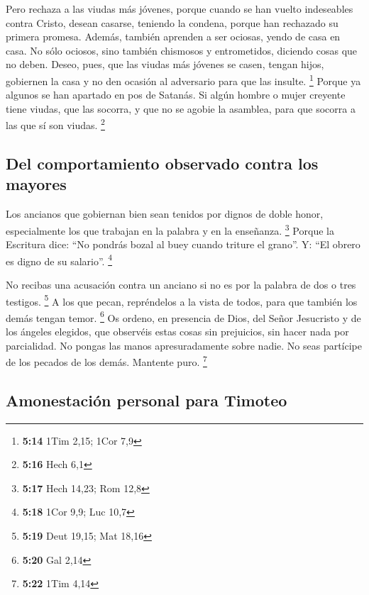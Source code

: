 \begin{paracol}{2}
 Pero rechaza a las viudas más jóvenes, porque cuando se
han vuelto indeseables contra Cristo, desean casarse, 
teniendo la condena, porque han rechazado su primera promesa.
 Además, también aprenden a ser ociosas, yendo de casa en
casa. No sólo ociosos, sino también chismosos y entrometidos, diciendo
cosas que no deben.  Deseo, pues, que las viudas más
jóvenes se casen, tengan hijos, gobiernen la casa y no den ocasión al
adversario para que las insulte. \footnote{\textbf{5:14} 1Tim 2,15; 1Cor
  7,9}  Porque ya algunos se han apartado en pos de
Satanás.  Si algún hombre o mujer creyente tiene viudas,
que las socorra, y que no se agobie la asamblea, para que socorra a las
que sí son viudas. \footnote{\textbf{5:16} Hech 6,1}

\hypertarget{del-comportamiento-observado-contra-los-mayores}{%
\subsection{Del comportamiento observado contra los
mayores}\label{del-comportamiento-observado-contra-los-mayores}}

 Los ancianos que gobiernan bien sean tenidos por dignos
de doble honor, especialmente los que trabajan en la palabra y en la
enseñanza. \footnote{\textbf{5:17} Hech 14,23; Rom 12,8} 
Porque la Escritura dice: ``No pondrás bozal al buey cuando triture el
grano''. Y: ``El obrero es digno de su salario''. \footnote{\textbf{5:18}
  1Cor 9,9; Luc 10,7}

 No recibas una acusación contra un anciano si no es por
la palabra de dos o tres testigos. \footnote{\textbf{5:19} Deut 19,15;
  Mat 18,16}  A los que pecan, repréndelos a la vista de
todos, para que también los demás tengan temor. \footnote{\textbf{5:20}
  Gal 2,14}  Os ordeno, en presencia de Dios, del Señor
Jesucristo y de los ángeles elegidos, que observéis estas cosas sin
prejuicios, sin hacer nada por parcialidad.  No pongas
las manos apresuradamente sobre nadie. No seas partícipe de los pecados
de los demás. Mantente puro. \footnote{\textbf{5:22} 1Tim 4,14}

\hypertarget{amonestaciuxf3n-personal-para-timoteo}{%
\subsection{Amonestación personal para
Timoteo}\label{amonestaciuxf3n-personal-para-timoteo}}


\end{paracol}
